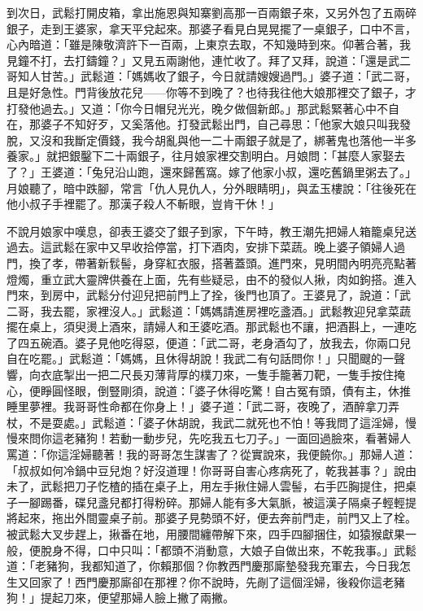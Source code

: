 到次日，武鬆打開皮箱，拿出施恩與知寨劉高那一百兩銀子來，又另外包了五兩碎銀子，走到王婆家，拿天平兌起來。那婆子看見白晃晃擺了一桌銀子，口中不言，心內暗道：「雖是陳敬濟許下一百兩，上東京去取，不知幾時到來。仰著合著，我見鐘不打，去打鑄鐘？」又見五兩謝他，連忙收了。拜了又拜，說道：「還是武二哥知人甘苦。」武鬆道：「媽媽收了銀子，今日就請嫂嫂過門。」婆子道：「武二哥，且是好急性。門背後放花兒——你等不到晚了？也待我往他大娘那裡交了銀子，才打發他過去。」又道：「你今日帽兒光光，晚夕做個新郎。」那武鬆緊著心中不自在，那婆子不知好歹，又奚落他。打發武鬆出門，自己尋思：「他家大娘只叫我發脫，又沒和我斷定價錢，我今胡亂與他一二十兩銀子就是了，綁著鬼也落他一半多養家。」就把銀鑿下二十兩銀子，往月娘家裡交割明白。月娘問：「甚麼人家娶去了？」王婆道：「兔兒沿山跑，還來歸舊窩。嫁了他家小叔，還吃舊鍋里粥去了。」月娘聽了，暗中跌腳，常言「仇人見仇人，分外眼睛明」，與孟玉樓說：「往後死在他小叔子手裡罷了。那漢子殺人不斬眼，豈肯干休！」

不說月娘家中嘆息，卻表王婆交了銀子到家，下午時，教王潮先把婦人箱籠桌兒送過去。這武鬆在家中又早收拾停當，打下酒肉，安排下菜蔬。晚上婆子領婦人過門，換了孝，帶著新䯼髻，身穿紅衣服，搭著蓋頭。進門來，見明間內明亮亮點著燈燭，重立武大靈牌供養在上面，先有些疑忌，由不的發似人揪，肉如鉤搭。進入門來，到房中，武鬆分付迎兒把前門上了拴，後門也頂了。王婆見了，說道：「武二哥，我去罷，家裡沒人。」武鬆道：「媽媽請進房裡吃盞酒。」武鬆教迎兒拿菜蔬擺在桌上，須臾燙上酒來，請婦人和王婆吃酒。那武鬆也不讓，把酒斟上，一連吃了四五碗酒。婆子見他吃得惡，便道：「武二哥，老身酒勾了，放我去，你兩口兒自在吃罷。」武鬆道：「媽媽，且休得胡說！我武二有句話問你！」只聞颼的一聲響，向衣底掣出一把二尺長刃薄背厚的樸刀來，一隻手籠著刀靶，一隻手按住掩心，便睜圓怪眼，倒豎剛須，說道：「婆子休得吃驚！自古冤有頭，債有主，休推睡里夢裡。我哥哥性命都在你身上！」婆子道：「武二哥，夜晚了，酒醉拿刀弄杖，不是耍處。」武鬆道：「婆子休胡說，我武二就死也不怕！等我問了這淫婦，慢慢來問你這老豬狗！若動一動步兒，先吃我五七刀子。」一面回過臉來，看著婦人罵道：「你這淫婦聽著！我的哥哥怎生謀害了？從實說來，我便饒你。」那婦人道：「叔叔如何冷鍋中豆兒炮？好沒道理！你哥哥自害心疼病死了，乾我甚事？」說由未了，武鬆把刀子忔楂的插在桌子上，用左手揪住婦人雲髻，右手匹胸提住，把桌子一腳踢番，碟兒盞兒都打得粉碎。那婦人能有多大氣脈，被這漢子隔桌子輕輕提將起來，拖出外間靈桌子前。那婆子見勢頭不好，便去奔前門走，前門又上了栓。被武鬆大叉步趕上，揪番在地，用腰間纏帶解下來，四手四腳捆住，如猿猴獻果一般，便脫身不得，口中只叫：「都頭不消動意，大娘子自做出來，不乾我事。」武鬆道：「老豬狗，我都知道了，你賴那個？你教西門慶那廝墊發我充軍去，今日我怎生又回家了！西門慶那廝卻在那裡？你不說時，先剮了這個淫婦，後殺你這老豬狗！」提起刀來，便望那婦人臉上撇了兩撇。


